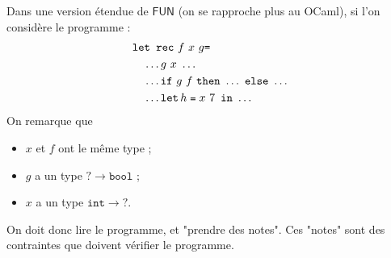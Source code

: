 \documentclass[../main]{subfiles}
\begin{document}
  \begin{exm}
    Dans une version étendue de $\mathsf{FUN}$ (on se rapproche plus au OCaml), si l'on considère le programme :
    \begin{align*}
    &\texttt{let rec}\ f\ x\ g \texttt{=}\\
    &\quad \ldots g\ x\ \ldots\\
    &\quad \ldots \texttt{if}\ g\ f\ \texttt{then}\ \ldots\ \texttt{else}\ \ldots\\
    &\quad\ldots\letin h {x\ 7} \ldots
    \end{align*}
    On remarque que 
    \begin{itemize}
      \item $x$ et $f$ ont le même type ;
      \item $g$ a un type ${?} \to \mathtt{bool}$ ;
      \item $x$ a un type $\mathtt{int} \to {?}$.
    \end{itemize}

    On doit donc lire le programme, et "prendre des notes".
    Ces "notes" sont des contraintes que doivent vérifier le programme.
  \end{exm}
\end{document}
